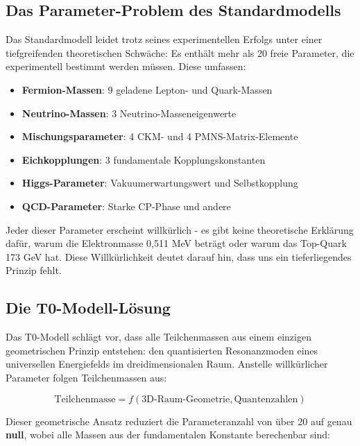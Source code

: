 \documentclass[12pt,a4paper]{article}
\begin{document}
	\subsection{Das Parameter-Problem des Standardmodells}
	\label{subsec:parameter_problem}
	
	Das Standardmodell leidet trotz seines experimentellen Erfolgs unter einer tiefgreifenden theoretischen Schwäche: Es enthält mehr als 20 freie Parameter, die experimentell bestimmt werden müssen. Diese umfassen:
	
	\begin{itemize}
		\item \textbf{Fermion-Massen}: 9 geladene Lepton- und Quark-Massen
		\item \textbf{Neutrino-Massen}: 3 Neutrino-Masseneigenwerte
		\item \textbf{Mischungsparameter}: 4 CKM- und 4 PMNS-Matrix-Elemente
		\item \textbf{Eichkopplungen}: 3 fundamentale Kopplungskonstanten
		\item \textbf{Higgs-Parameter}: Vakuumerwartungswert und Selbstkopplung
		\item \textbf{QCD-Parameter}: Starke CP-Phase und andere
	\end{itemize}
	
	Jeder dieser Parameter erscheint willkürlich - es gibt keine theoretische Erklärung dafür, warum die Elektronmasse 0,511 MeV beträgt oder warum das Top-Quark 173 GeV hat. Diese Willkürlichkeit deutet darauf hin, dass uns ein tieferliegendes Prinzip fehlt.
	
	\subsection{Die T0-Modell-Lösung}
	\label{subsec:t0_solution}
	
	Das T0-Modell schlägt vor, dass alle Teilchenmassen aus einem einzigen geometrischen Prinzip entstehen: den quantisierten Resonanzmoden eines universellen Energiefelds im dreidimensionalen Raum. Anstelle willkürlicher Parameter folgen Teilchenmassen aus:
	
	\begin{equation}
		\text{Teilchenmasse} = f(\text{3D-Raum-Geometrie}, \text{Quantenzahlen})
		\label{eq:t0_principle}
	\end{equation}
	
	Dieser geometrische Ansatz reduziert die Parameteranzahl von über 20 auf genau \textbf{null}, wobei alle Massen aus der fundamentalen Konstante berechenbar sind:
	
\end{document}
